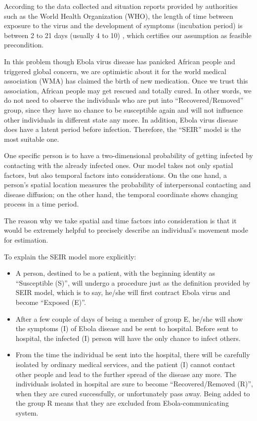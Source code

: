 \documentclass[12pt]{article}
\begin{document}
According to the data collected and situation reports provided by authorities such as the World Health Organization (WHO), the length of time between exposure to the virus and the development of symptoms (incubation period) is between 2 to 21 days (usually 4 to 10) \cite{Ebolavirusdisease}, which certifies our assumption as feasible precondition. 

In this problem though Ebola virus disease has panicked African people and triggered global concern, we are optimistic about it for the world medical association (WMA) has claimed the birth of new medication. Once we trust this association, African people may get rescued and totally cured. In other words, we do not need to observe the individuals who are put into ``Recovered/Removed'' group, since they have no chance to be susceptible again and will not influence other individuals in different state any more. In addition, Ebola virus disease does have a latent period before infection. Therefore, the ``SEIR'' model is the most suitable one.

One specific person is to have a two-dimensional probability of getting infected by contacting with the already infected ones. Our model takes not only spatial factors, but also temporal factors into considerations. On the one hand, a person's spatial location measures the probability of interpersonal contacting and disease diffusion; on the other hand, the temporal coordinate shows changing process in a time period.

The reason why we take spatial and time factors into consideration is that it would be extremely helpful to precisely describe an individual’s movement mode for estimation.

To explain the SEIR model more explicitly:

\begin{itemize}
\item A person, destined to be a patient, with the beginning identity as ``Susceptible (S)'', will undergo a procedure just as the definition provided by SEIR model, which is to say, he/she will first contract Ebola virus and become ``Exposed (E)''.

\item After a few couple of days of being a member of group E, he/she will show the symptoms (I) of Ebola disease and be sent to hospital. Before sent to hospital, the infected (I) person will have the only chance to infect others.

\item From the time the individual be sent into the hospital, there will be carefully isolated by ordinary medical services, and the patient (I) cannot contact other people and lead to the further spread of the disease any more. The individuals isolated in hospital are sure to become ``Recovered/Removed (R)'', when they are cured successfully, or unfortunately pass away. Being added to the group R means that they are excluded from Ebola-communicating system.
\end{itemize}
\end{document}
